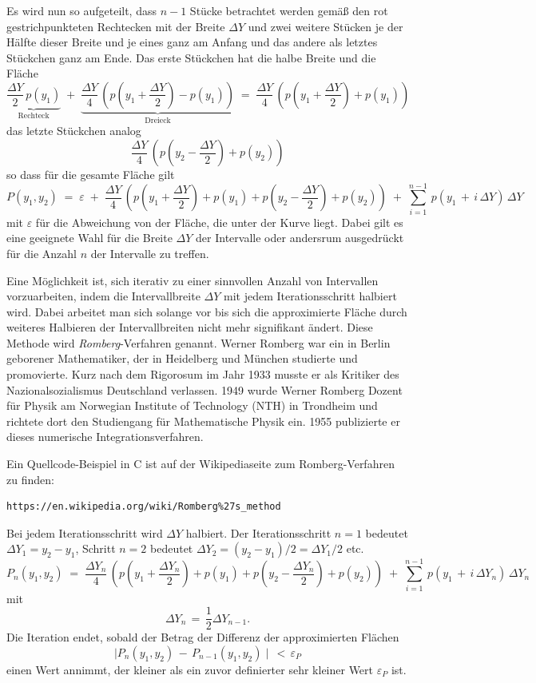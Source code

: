 Es wird nun so aufgeteilt, dass $n-1$ Stücke betrachtet werden gemäß den rot
gestrichpunkteten Rechtecken mit der Breite $\Delta Y$ und zwei weitere Stücken je
der Hälfte dieser Breite und je eines ganz am Anfang und das andere als letztes
Stückchen ganz am Ende.
Das erste Stückchen hat die halbe Breite und die Fläche
$$
\underbrace{\frac{\Delta Y}{2} \, p(y_1)}_{\mathrm{Rechteck}}
 \; + \; 
\underbrace{\frac{\Delta Y}{4} \, (p(y_1 + \frac{\Delta Y}{2}) - p(y_1))}_{\mathrm{Dreieck}}
\; = \;
\frac{\Delta Y}{4} \, (p(y_1 + \frac{\Delta Y}{2}) + p(y_1))
$$
das letzte Stückchen analog
$$
\frac{\Delta Y}{4} \, (p(y_2 - \frac{\Delta Y}{2}) + p(y_2))
$$
so dass für die gesamte Fläche gilt
\begin{equation}
P(y_1, y_2) \; = \; \varepsilon \; + \;
\frac{\Delta Y}{4} \, \left(p(y_1 + \frac{\Delta Y}{2}) + p(y_1) +
p(y_2 - \frac{\Delta Y}{2}) + p(y_2)\right) \; + \;
\sum\limits_{i=1}^{n-1} \,
p(y_1 \, + \, i \, \Delta Y) \, \Delta Y
\end{equation}
mit $\varepsilon$ für die Abweichung von der Fläche, die unter der Kurve liegt.
Dabei gilt es eine geeignete Wahl für die Breite $\Delta Y$ der Intervalle
oder andersrum ausgedrückt für die Anzahl $n$ der Intervalle zu treffen.

Eine Möglichkeit ist, sich iterativ zu einer sinnvollen Anzahl von Intervallen
vorzuarbeiten, indem die Intervallbreite $\Delta Y$ mit jedem Iterationsschritt halbiert wird.
Dabei arbeitet man sich solange vor bis sich die approximierte Fläche
durch weiteres Halbieren der Intervallbreiten nicht mehr 
signifikant ändert. Diese Methode wird \textsl{Romberg}-Verfahren genannt.
Werner Romberg war ein in Berlin geborener Mathematiker, der in Heidelberg und München
studierte und promovierte. Kurz nach dem Rigorosum im Jahr 1933 musste er als Kritiker
des Nazionalsozialismus Deutschland verlassen. 1949 wurde Werner Romberg Dozent für Physik
am Norwegian Institute of Technology (NTH) in Trondheim und richtete dort den Studiengang
für Mathematische Physik ein. 1955 publizierte er dieses numerische Integrationsverfahren.

Ein Quellcode-Beispiel in C ist auf der Wikipediaseite zum Romberg-Verfahren zu finden:
\begin{verbatim}
https://en.wikipedia.org/wiki/Romberg%27s_method
\end{verbatim}
Bei jedem Iterationsschritt wird $\Delta Y$ halbiert.
Der Iterationsschritt $n = 1$ bedeutet $\Delta Y_1 = y_2 - y_1$, Schritt $n = 2$
bedeutet $\Delta Y_2 = (y_2 - y_1)/2 = \Delta Y_1/2$ etc.
\begin{equation}
P_n (y_1, y_2) \; = \;
\frac{\Delta Y_n}{4} \, (p(y_1 + \frac{\Delta Y_n}{2}) + p(y_1) +
p(y_2 - \frac{\Delta Y_n}{2}) + p(y_2)) \; + \;
\sum\limits_{i=1}^{n-1} \,
p(y_1 \, + \, i \, \Delta Y_n) \, \Delta Y_n
\end{equation}
mit
$$
 \Delta Y_n \, = \, \frac{1}{2} \Delta Y_{n-1} .
$$
Die Iteration endet, sobald der Betrag der Differenz der approximierten Flächen
\begin{equation}
\mid P_n (y_1, y_2) \, - \, P_{n-1} (y_1, y_2) \mid \, < \, \varepsilon_P
\end{equation}
einen Wert annimmt, der kleiner als ein zuvor definierter sehr kleiner Wert $\varepsilon_P$ ist.

